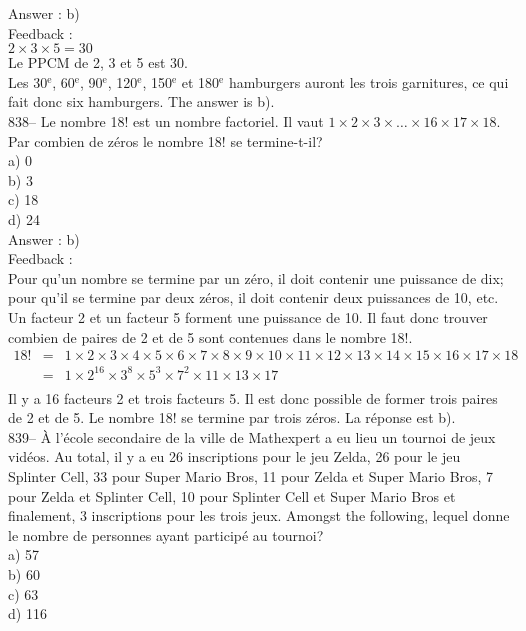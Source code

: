 \documentclass[letterpaper, 12pt]{article}
\begin{document}
Answer : b)\\

Feedback : \\
$2\times3\times5=30$\\
Le PPCM de 2, 3 et 5 est 30.  \\
Les 30$^{\textrm{e}}$, 60$^{\textrm{e}}$, 90$^{\textrm{e}}$,
120$^{\textrm{e}}$, 150$^{\textrm{e}}$ et 180$^{\textrm{e}}$
hamburgers auront  les trois garnitures, ce qui fait donc six hamburgers.
The answer is b).\\

838-- Le nombre 18! est un nombre factoriel.  Il vaut
$1\times2\times3\times\ldots\times16\times17\times18$.  Par combien
de
z\'eros le nombre 18! se termine-t-il?\\
a) 0\\
b) 3\\
c) 18\\
d) 24\\

Answer : b)\\

Feedback : \\
Pour qu'un nombre se termine par un z\'ero, il doit contenir une
puissance de dix; pour qu'il se termine par deux z\'eros, il doit
contenir deux puissances de 10, etc.  Un facteur 2 et un facteur 5
forment une puissance de 10.  Il faut donc trouver combien de paires
de 2 et de 5 sont contenues dans le nombre 18!.
\begin{eqnarray*}
18!
&=&1\times2\times3\times4\times5\times6\times7\times8\times9\times10\times11\times12\times13\times14\times15\times16\times17\times18\\[2mm]
&=&1\times2^{16}\times3^{8}\times5^{3}\times7^{2}\times11\times13\times17\\[2mm]
\end{eqnarray*}
Il y a 16 facteurs 2 et trois facteurs 5.  Il est donc possible de former
trois paires de 2 et de 5.  Le nombre 18! se termine par trois z\'eros.  La
r\'eponse est b).\\

839-- \`A l'\'ecole secondaire de la ville de Mathexpert a eu lieu un
tournoi de jeux vid\'eos.  Au total, il y a  eu 26 inscriptions pour le jeu
Zelda, 26 pour le jeu Splinter Cell, 33 pour Super Mario Bros, 11 pour Zelda
et Super Mario Bros, 7 pour Zelda et Splinter Cell,  10 pour Splinter Cell
et Super Mario Bros et finalement, 3 inscriptions pour les trois jeux.
Amongst the following, lequel donne le nombre de personnes ayant
particip\'e au tournoi?\\
a) 57\\
b) 60\\
c) 63\\
d) 116\\
\end{document}
